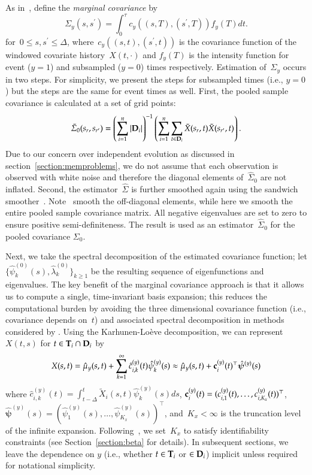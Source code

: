 \documentclass[11pt]{amsart}
\def\bfT{{\bf T}}
\def\bfD{{\bf D}}
\begin{document}
As in~\cite{Park2018}, define the \emph{marginal covariance} by
\[
\Sigma_y (s, s^\prime) = \int_{0}^\tau c_y( (s,T), (s^\prime, T) ) f_y(T) dt.
\]
for~$0 \leq s,s^\prime \leq \Delta$, where~$c_y((s,t), (s^\prime,t))$ is the covariance function of the windowed covariate history~$X(t,\cdot)$ and $f_y(T)$ is the intensity function for event ($y=1$) and subsampled ($y=0$) times respectively. Estimation of~$\Sigma_y$ occurs in two steps. For simplicity, we present the steps for subsampled times (i.e., $y=0$) but the steps are the same for event times as well. First, the pooled sample covariance is calculated at a set of grid points:
\[
\tilde \Sigma_0 (s_r , s_{r^\prime}) = \left( \sum_{i=1}^n \left | \bfD_i \right |\right)^{-1} \left( \sum_{i=1}^n \sum_{t \in \bfD_i} \tilde X (s_r,t) \tilde X (s_{r^\prime}, t) \right).
\]
Due to our concern over independent evolution as discussed in section~\ref{section:memproblems}, we do not assume that each observation is observed with white noise and therefore the diagonal elements of~$\hat \Sigma_0$ are not inflated. Second, the estimator~$\hat \Sigma$ is further smoothed again using the sandwich smoother~\citep{Xiao2013}. Note~\cite{Park2018} smooth the off-diagonal elements, while here we smooth the entire pooled sample covariance matrix. All negative eigenvalues are set to zero to ensure positive semi-definiteness. The result is used as an estimator~$\hat \Sigma_0$ for the pooled covariance $\Sigma_0$.

Next, we take the spectral decomposition of the estimated covariance function; let $\{ \hat \psi^{(0)}_k (s),\hat \lambda^{(0)}_k \}_{k \geq 1}$ be the resulting sequence of eigenfunctions and eigenvalues. The key benefit of the marginal covariance approach is that it allows us to compute a single, time-invariant basis expansion; this reduces the computational burden by avoiding the three dimensional covariance function (i.e., covariance depends on~$t$) and associated spectral decomposition in methods considered by \cite{ChenMuller2012}. Using the Karhunen-Lo{\`e}ve decomposition, we can represent~$X(t,s)$ for $t \in \bfT_i \cap \bfD_i$ by
\[
X(s,t) = \hat \mu_y (s,t) + \sum_{k=1}^{\infty} \hat c^{(y)}_{i,k} (t) \hat
\psi^{(y)}_k (s) \approx \hat \mu_y (s,t) + {\bf c}^{(y)}_{i} (t)^\top \mathbold{\hat
  \psi}^{(y)} (s)
\]
where $\hat c^{(y)}_{i,k} (t) = \int_{t-\Delta}^t \tilde X_i (s,t) \hat \psi^{(y)}_k (s) ds$, ${\bf c}^{(y)}_i (t) = (c^{(y)}_{i,1} (t), \ldots, c^{(y)}_{i,K_x} (t))^\top$, $\mathbold{\hat \psi}^{(y)} (s) = (\hat \psi^{(y)}_1 (s), \ldots, \hat \psi^{(y)}_{K_x} (s))^\top$, and~$K_x < \infty$ is the truncation level of the infinite expansion. Following~\cite{Goldsmith2011}, we set~$K_x$ to satisfy identifiability constraints (see Section~\ref{section:beta} for details). In subsequent sections, we leave the dependence on $y$ (i.e., whether $t \in \bfT_i$ or $\in \bfD_i$) implicit unless required for notational simplicity.
\end{document}
